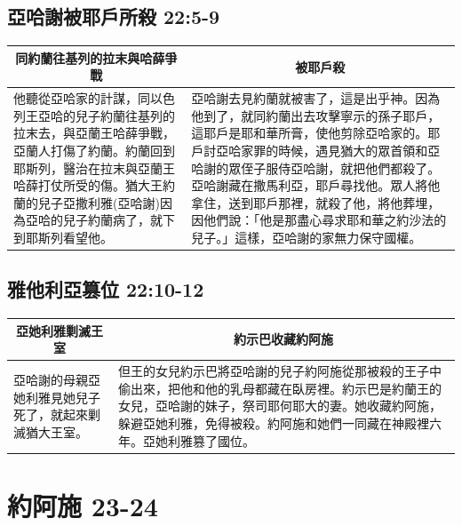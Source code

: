 \subsection{亞哈謝被耶戶所殺 22:5-9}
\begin{table}[H]
\centering 
\begin{tabular}{p{6.75cm}|p{10.5cm}}\hline\hline
\multicolumn{1}{c|}{同約蘭往基列的拉末與哈薛爭戰}&\multicolumn{1}{c}{被耶戶殺}\\\hline\hline
他聽從亞哈家的計謀，同以色列王亞哈的兒子約蘭往基列的拉末去，與亞蘭王哈薛爭戰，亞蘭人打傷了約蘭。約蘭回到耶斯列，醫治在拉末與亞蘭王哈薛打仗所受的傷。猶大王約蘭的兒子亞撒利雅(亞哈謝)因為亞哈的兒子約蘭病了，就下到耶斯列看望他。
&亞哈謝去見約蘭就被害了，這是出乎神。因為他到了，就同約蘭出去攻擊寧示的孫子耶戶，這耶戶是耶和華所膏，使他剪除亞哈家的。耶戶討亞哈家罪的時候，遇見猶大的眾首領和亞哈謝的眾侄子服侍亞哈謝，就把他們都殺了。亞哈謝藏在撒馬利亞，耶戶尋找他。眾人將他拿住，送到耶戶那裡，就殺了他，將他葬埋，因他們說：「他是那盡心尋求耶和華之約沙法的兒子。」這樣，亞哈謝的家無力保守國權。\\\hline
\end{tabular}
\end{table}


\subsection{雅他利亞篡位 22:10-12}
\begin{table}[H]
\centering 
\begin{tabular}{p{3.5cm}|p{13.5cm}}\hline\hline
\multicolumn{1}{c|}{亞她利雅剿滅王室}&\multicolumn{1}{c}{約示巴收藏約阿施}\\\hline\hline
亞哈謝的母親亞她利雅見她兒子死了，就起來剿滅猶大王室。
&但王的女兒約示巴將亞哈謝的兒子約阿施從那被殺的王子中偷出來，把他和他的乳母都藏在臥房裡。約示巴是約蘭王的女兒，亞哈謝的妹子，祭司耶何耶大的妻。她收藏約阿施，躲避亞她利雅，免得被殺。約阿施和她們一同藏在神殿裡六年。亞她利雅篡了國位。\\\hline
\end{tabular}
\end{table}


\section{約阿施 23-24 }
